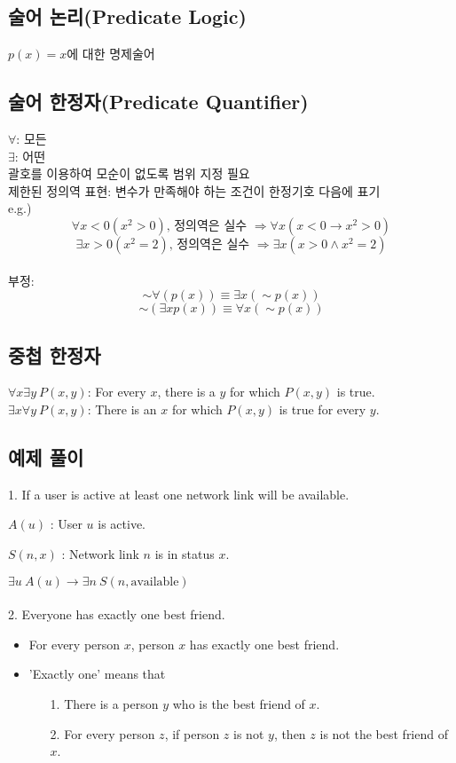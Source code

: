 \subsection{술어 논리(Predicate Logic)}
$p(x)=x$에 대한 명제술어
\subsection{술어 한정자(Predicate Quantifier)}
$\forall$: 모든\\
$\exists$: 어떤\\
괄호를 이용하여 모순이 없도록 범위 지정 필요\\
제한된 정의역 표현: 변수가 만족해야 하는 조건이 한정기호 다음에 표기\\
e.g.) $$\forall x<0(x^2>0)\text{, 정의역은 실수 }\Longrightarrow \forall x (x < 0 \rightarrow x^2>0)$$
$$\exists x>0(x^2=2)\text{, 정의역은 실수 }\Longrightarrow \exists x(x>0 \land x^2=2)$$
\\
부정:
$$\sim \forall(p(x)) \equiv \exists x(\sim p(x))$$
$$\sim (\exists x p(x)) \equiv \forall x(\sim p(x))$$

\subsection{중첩 한정자}
$\forall x \exists y\ P(x, y)$: For every $x$, there is a $y$ for which $P(x, y)$ is true.\\
$\exists x \forall y\ P(x, y)$: There is an $x$ for which $P(x, y)$ is true for every $y$.

\subsection{예제 풀이}
1. If a user is active at least one network link will be available.

$A(u)$ : User $u$ is active.

$S(n, x)$ : Network link $n$ is in status $x$.

$\exists u\ A(u) \to \exists n\ S(n, \text{available})$\\\\
2. Everyone has exactly one best friend.
\begin{itemize}[label=$\to$]
    \item For every person $x$, person $x$ has exactly one best friend.
    \item 'Exactly one' means that
    \begin{itemize}
        \item[1.] There is a person $y$ who is the best friend of $x$.
        \item[2.] For every person $z$, if person $z$ is not $y$, then $z$ is not the best friend of $x$.
    \end{itemize}
\end{itemize}

